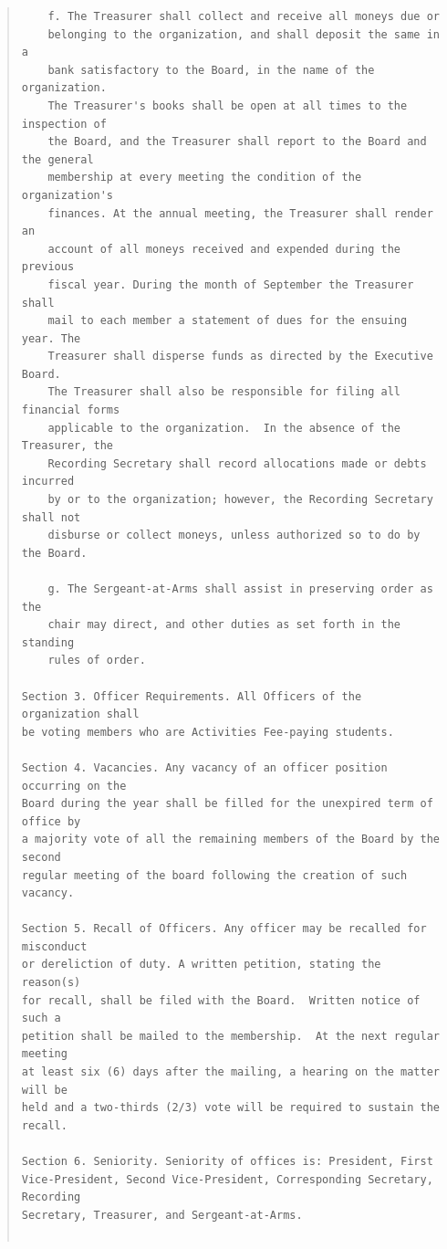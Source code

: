 \documentclass{article}
\begin{document}
\begin{quote}
\begin{verbatim}
    f. The Treasurer shall collect and receive all moneys due or
    belonging to the organization, and shall deposit the same in a
    bank satisfactory to the Board, in the name of the organization.
    The Treasurer's books shall be open at all times to the inspection of
    the Board, and the Treasurer shall report to the Board and the general
    membership at every meeting the condition of the organization's
    finances. At the annual meeting, the Treasurer shall render an
    account of all moneys received and expended during the previous
    fiscal year. During the month of September the Treasurer shall
    mail to each member a statement of dues for the ensuing year. The
    Treasurer shall disperse funds as directed by the Executive Board.
    The Treasurer shall also be responsible for filing all financial forms
    applicable to the organization.  In the absence of the Treasurer, the
    Recording Secretary shall record allocations made or debts incurred
    by or to the organization; however, the Recording Secretary shall not
    disburse or collect moneys, unless authorized so to do by the Board.

    g. The Sergeant-at-Arms shall assist in preserving order as the
    chair may direct, and other duties as set forth in the standing
    rules of order.

Section 3. Officer Requirements. All Officers of the organization shall
be voting members who are Activities Fee-paying students.

Section 4. Vacancies. Any vacancy of an officer position occurring on the
Board during the year shall be filled for the unexpired term of office by
a majority vote of all the remaining members of the Board by the second
regular meeting of the board following the creation of such vacancy.

Section 5. Recall of Officers. Any officer may be recalled for misconduct
or dereliction of duty. A written petition, stating the reason(s)
for recall, shall be filed with the Board.  Written notice of such a
petition shall be mailed to the membership.  At the next regular meeting
at least six (6) days after the mailing, a hearing on the matter will be
held and a two-thirds (2/3) vote will be required to sustain the recall.

Section 6. Seniority. Seniority of offices is: President, First
Vice-President, Second Vice-President, Corresponding Secretary, Recording
Secretary, Treasurer, and Sergeant-at-Arms.


\end{verbatim}
\end{quote}
\end{document}
